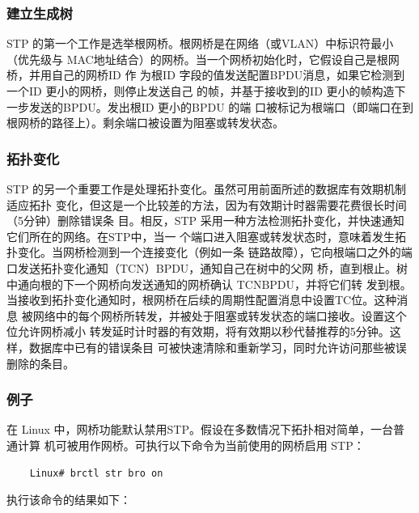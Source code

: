 \subsubsection{建立生成树}

STP 的第一个工作是选举根网桥。根网桥是在网络（或VLAN）中标识符最小（优先级与
MAC地址结合）的网桥。当一个网桥初始化时，它假设自己是根网桥，并用自己的网桥ID 作
为根ID 字段的值发送配置BPDU消息，如果它检测到一个ID 更小的网桥，则停止发送自己
的帧，并基于接收到的ID 更小的帧构造下一步发送的BPDU。发出根ID 更小的BPDU 的端
口被标记为根端口（即端口在到根网桥的路径上）。剩余端口被设置为阻塞或转发状态。

\subsubsection{拓扑变化}

STP 的另一个重要工作是处理拓扑变化。虽然可用前面所述的数据库有效期机制适应拓扑
变化，但这是一个比较差的方法，因为有效期计时器需要花费很长时间（5分钟）删除错误条
目。相反，STP 采用一种方法检测拓扑变化，并快速通知它们所在的网络。在STP中，当一
个端口进入阻塞或转发状态时，意味着发生拓扑变化。当网桥检测到一个连接变化（例如一条
链路故障），它向根端口之外的端口发送拓扑变化通知（TCN）BPDU，通知自己在树中的父网
桥，直到根止。树中通向根的下一个网桥向发送通知的网桥确认 TCNBPDU，并将它们转
发到根。当接收到拓扑变化通知时，根网桥在后续的周期性配置消息中设置TC位。这种消息
被网络中的每个网桥所转发，并被处于阻塞或转发状态的端口接收。设置这个位允许网桥减小
转发延时计时器的有效期，将有效期以秒代替推荐的5分钟。这样，数据库中已有的错误条目
可被快速清除和重新学习，同时允许访问那些被误删除的条目。

\subsubsection{例子}

在 Linux 中，网桥功能默认禁用STP。假设在多数情况下拓扑相对简单，一台普通计算
机可被用作网桥。可执行以下命令为当前使用的网桥启用 STP：

\begin{verbatim}
    Linux# brctl str bro on
\end{verbatim}

执行该命令的结果如下：

